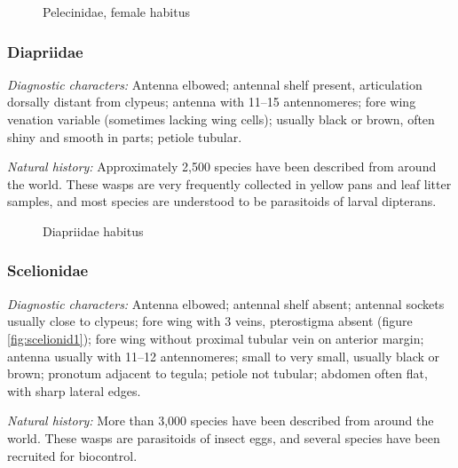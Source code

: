 \begin{figure}[ht!]
  \centering
  \caption{Pelecinidae, female habitus \citep[][Fig. 198]{goulet1993hymenoptera}}
  \label{fig:pelecinid1}
\end{figure}

\subsubsection{Diapriidae}
\noindent{}\textit{Diagnostic characters:} Antenna elbowed; antennal shelf present, articulation dorsally distant from clypeus; antenna with 11--15 antennomeres; fore wing venation variable (sometimes lacking wing cells); usually black or brown, often shiny and smooth in parts; petiole tubular.\vspace{3mm}

\noindent{}\textit{Natural history:} Approximately 2,500 species have been described from around the world. These wasps are very frequently collected in yellow pans and leaf litter samples, and most species are understood to be parasitoids of larval dipterans.

\begin{figure}[ht!]
  \centering
  \caption{Diapriidae habitus \citep[][Fig. 206]{goulet1993hymenoptera}}
  \label{fig:diapriid1}
\end{figure}

\subsubsection{Scelionidae}
\noindent{}\textit{Diagnostic characters:} Antenna elbowed; antennal shelf absent; antennal sockets usually close to clypeus; fore wing with 3 veins, pterostigma absent (figure \ref{fig:scelionid1}); fore wing without proximal tubular vein on anterior margin; antenna usually with 11--12 antennomeres; small to very small, usually black or brown; pronotum adjacent to tegula; petiole not tubular; abdomen often flat, with sharp lateral edges.\vspace{3mm}

\noindent{}\textit{Natural history:} More than 3,000 species have been described from around the world. These wasps are parasitoids of insect eggs, and several species have been recruited for biocontrol.\vspace{3mm}

